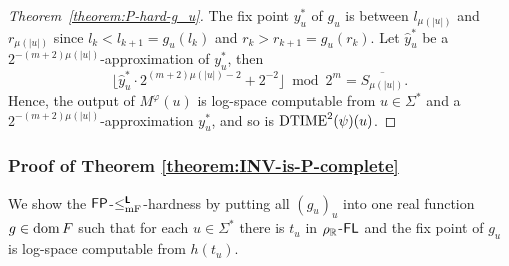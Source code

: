 \documentclass[a4paper,UKenglish]{lipics}
\begin{document}
\begin{proof}[Theorem~\ref{theorem:P-hard-g_u}]
 The fix point $y^*_u$ of $g_u$ is between $l_{\mu(|u|)}$ and $r_{\mu(|u|)}$ 
 since $l_k < l_{k+1} = g_u(l_k)$ and $r_k > r_{k+1} = g_u(r_k)$.
 Let $\hat y^*_u$ be a $2^{-(m+2)\mu(|u|)}$-approximation of $y^*_u$, then
\begin{equation}
 \lfloor \hat y^*_u \cdot 2^{(m+2)\mu(|u|)-2} + 2^{-2}\rfloor  \bmod 2^m
  =
  \overline{S_{\mu(|u|)}}.
\end{equation}
 Hence, the output of $M^\varphi(u)$ is log-space computable from 
 $u \in \Sigma^*$ and a $2^{-(m+2)\mu(|u|)}$-approximation $y^*_u$, and so is
 $\mathrm{DTIME}^2(\psi)(u)$.
\end{proof}


\subsubsection{Proof of Theorem \ref{theorem:INV-is-P-complete}}
\label{section:proofs-of-theorems}

We show the $\mathsf{FP}$-$\leq _{\mathrm{mF}} ^{\text{\bfseries \sffamily \upshape L}}$-hardness 
by putting all $(g_u)_u$ into one real function $g \in \mathop{\rm dom} F$
such that for each $u \in \Sigma^*$ there is 
$t_u$ in $\rho _\mathbb R$-$\mathsf{FL}$ 
and the fix point of $g_u$ is log-space computable from $h(t_u)$.
\end{document}
